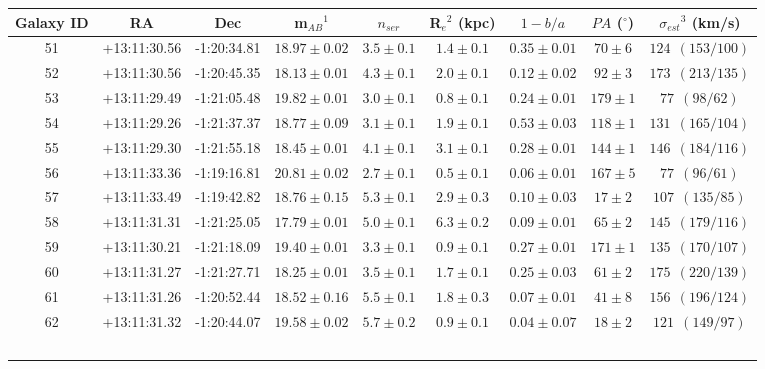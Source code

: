 \documentclass[useAMS,usenatbib]{mn2e}
\begin{document}
\begin{table}
  \begin{tabular}{ccccccccc}
    \hline
    Galaxy ID &  RA & Dec & m$_{AB}$$^1$ & $n_{ser}$& R$_e$$^2$ (kpc) & $1-b/a$& $PA$ ($^\circ$) & $\sigma_{est}$$^3$ (km/s)\\
    \hline
    \hline
        51 & +13:11:30.56 & -1:20:34.81 & $18.97\pm0.02$ & $3.5\pm0.1$ & $1.4\pm0.1$ & $0.35\pm0.01$ & $ 70\pm6$ & $124  ~~(153/100)$ \\
        52 & +13:11:30.56 & -1:20:45.35 & $18.13\pm0.01$ & $4.3\pm0.1$ & $2.0\pm0.1$ & $0.12\pm0.02$ & $ 92\pm3$ & $173  ~~(213/135)$ \\
        53 & +13:11:29.49 & -1:21:05.48 & $19.82\pm0.01$ & $3.0\pm0.1$ & $0.8\pm0.1$ & $0.24\pm0.01$ & $179\pm1$ & $ 77  ~~(98/62)$ \\
        54 & +13:11:29.26 & -1:21:37.37 & $18.77\pm0.09$ & $3.1\pm0.1$ & $1.9\pm0.1$ & $0.53\pm0.03$ & $118\pm1$ & $131  ~~(165/104)$ \\
        55 & +13:11:29.30 & -1:21:55.18 & $18.45\pm0.01$ & $4.1\pm0.1$ & $3.1\pm0.1$ & $0.28\pm0.01$ & $144\pm1$ & $146  ~~(184/116)$ \\
        56 & +13:11:33.36 & -1:19:16.81 & $20.81\pm0.02$ & $2.7\pm0.1$ & $0.5\pm0.1$ & $0.06\pm0.01$ & $167\pm5$ & $ 77  ~~(96/61)$ \\
        57 & +13:11:33.49 & -1:19:42.82 & $18.76\pm0.15$ & $5.3\pm0.1$ & $2.9\pm0.3$ & $0.10\pm0.03$ & $ 17\pm2$ & $107  ~~(135/85)$ \\
        58 & +13:11:31.31 & -1:21:25.05 & $17.79\pm0.01$ & $5.0\pm0.1$ & $6.3\pm0.2$ & $0.09\pm0.01$ & $ 65\pm2$ & $145  ~~(179/116)$ \\
        59 & +13:11:30.21 & -1:21:18.09 & $19.40\pm0.01$ & $3.3\pm0.1$ & $0.9\pm0.1$ & $0.27\pm0.01$ & $171\pm1$ & $135  ~~(170/107)$ \\
        60 & +13:11:31.27 & -1:21:27.71 & $18.25\pm0.01$ & $3.5\pm0.1$ & $1.7\pm0.1$ & $0.25\pm0.03$ & $ 61\pm2$ & $175  ~~(220/139)$ \\
        61 & +13:11:31.26 & -1:20:52.44 & $18.52\pm0.16$ & $5.5\pm0.1$ & $1.8\pm0.3$ & $0.07\pm0.01$ & $ 41\pm8$ & $156  ~~(196/124)$ \\
        62 & +13:11:31.32 & -1:20:44.07 & $19.58\pm0.02$ & $5.7\pm0.2$ & $0.9\pm0.1$ & $0.04\pm0.07$ & $ 18\pm2$ & $121  ~~(149/97)$ \\
$$
\end{tabular}
\end{table}
\end{document}
